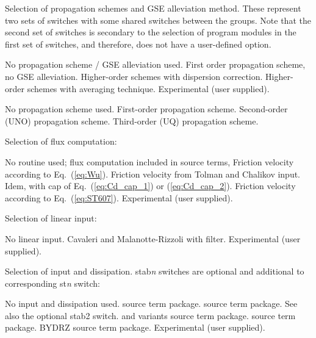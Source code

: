 \noindent
Selection of propagation schemes and GSE alleviation method. These represent
two sets of switches with some shared switches between the groups. Note that
the second set of switches is secondary to the selection of program modules
in the first set of switches, and therefore, does not have a user-defined
option.
\begin{slist}
 {No propagation scheme / GSE alleviation used.}
 {First order propagation scheme, no GSE alleviation.}
 {Higher-order schemes with \cite{art:BH87} dispersion correction.}
 {Higher-order schemes with \cite{tol:OMOD02b} averaging technique.}
 {Experimental (user supplied).}
\end{slist}

\begin{slist}
 {No propagation scheme used.}
 {First-order propagation scheme.}
 {Second-order (UNO) propagation scheme.}
 {Third-order (UQ) propagation scheme.}
\end{slist}

\noindent
Selection of flux computation:
\begin{slist}
 {No routine used; flux computation included in source terms,}
 {Friction velocity according to Eq.~(\ref{eq:Wu}).}
 {Friction velocity from Tolman and Chalikov input.}
 {Idem, with cap of Eq.~(\ref{eq:Cd_cap_1}) or (\ref{eq:Cd_cap_2}).}
 {Friction velocity according to Eq.~(\ref{eq:ST607}).}
 {Experimental (user supplied).}
\end{slist}

\noindent
Selection of linear input:
\begin{slist}
 {No linear input.}
 {Cavaleri and Malanotte-Rizzoli with filter.}
 {Experimental (user supplied).}
\end{slist}

\noindent
Selection of input and dissipation. {\F stab{}\it n} switches are optional and
additional to corresponding {\F st{\it n}} switch:
\begin{slist}
 {No input and dissipation used.}
 {\wam{} source term package.}
 {\cite{tol:JPO96} source term package. See also the optional 
          {\F stab2} switch.}
 {\wam{} and variants source term package.}
 {\cite{art:Aea10} source term package.}
 {BYDRZ source term package.}
 {Experimental (user supplied).}
\end{slist}

